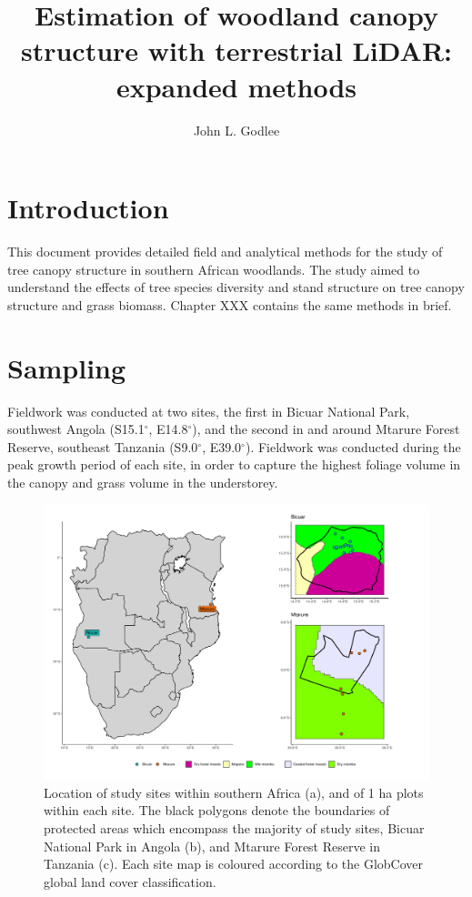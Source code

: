 \documentclass[11pt,a4paper]{article}
\title{Estimation of woodland canopy structure with terrestrial LiDAR: expanded methods}
\author{John L. Godlee}
\date{}
\begin{document}
\maketitle{}

\tableofcontents{}

\linenumbers

\section{Introduction}

This document provides detailed field and analytical methods for the study of tree canopy structure in southern African woodlands. The study aimed to understand the effects of tree species diversity and stand structure on tree canopy structure and grass biomass. Chapter XXX contains the same methods in brief.

\section{Sampling}

Fieldwork was conducted at two sites, the first in Bicuar National Park, southwest Angola (S15.1$^\circ$, E14.8$^\circ$), and the second in and around Mtarure Forest Reserve, southeast Tanzania (S9.0$^\circ$, E39.0$^\circ$). Fieldwork was conducted during the peak growth period of each site, in order to capture the highest foliage volume in the canopy and grass volume in the understorey.

\begin{figure}[H]
\centering
	\includegraphics[width=\textwidth]{map}
	\caption{Location of study sites within southern Africa (a), and of 1 ha plots within each site. The black polygons denote the boundaries of protected areas which encompass the majority of study sites, Bicuar National Park in Angola (b), and Mtarure Forest Reserve in Tanzania (c). Each site map is coloured according to the GlobCover global land cover classification.}
	\label{map}
\end{figure}
\end{document}
